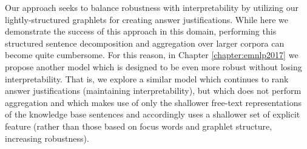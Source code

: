 
Our approach seeks to balance robustness with interpretability by utilizing our lightly-structured graphlets for creating answer justifications.  While here we demonstrate the success of this approach in this domain, performing this structured sentence decomposition and aggregation over larger corpora can become quite cumbersome.  For this reason, in Chapter \ref{chapter:emnlp2017} we propose another model which is designed to be even more robust without losing interpretability.  That is, we explore a similar model which continues to rank answer justifications (maintaining interpretability), but which does not perform aggregation and which makes use of only the shallower free-text representations of the knowledge base sentences and accordingly uses a shallower set of explicit feature (rather than those based on focus words and graphlet structure, increasing robustness).  %

